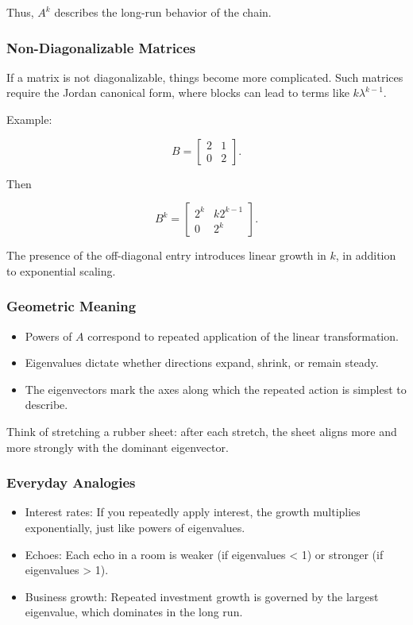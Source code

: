 \documentclass[
  letterpaper,
  DIV=11,
  numbers=noendperiod]{scrreprt}
\providecommand{\tightlist}{%
  \setlength{\itemsep}{0pt}\setlength{\parskip}{0pt}}
\begin{document}
Thus, \(A^k\) describes the long-run behavior of the chain.

\subsubsection{Non-Diagonalizable
Matrices}\label{non-diagonalizable-matrices}

If a matrix is not diagonalizable, things become more complicated. Such
matrices require the Jordan canonical form, where blocks can lead to
terms like \(k \lambda^{k-1}\).

Example:

\[
B = \begin{bmatrix} 2 & 1 \\ 0 & 2 \end{bmatrix}.
\]

Then

\[
B^k = \begin{bmatrix} 2^k & k 2^{k-1} \\ 0 & 2^k \end{bmatrix}.
\]

The presence of the off-diagonal entry introduces linear growth in
\(k\), in addition to exponential scaling.

\subsubsection{Geometric Meaning}\label{geometric-meaning-13}

\begin{itemize}
\tightlist
\item
  Powers of \(A\) correspond to repeated application of the linear
  transformation.
\item
  Eigenvalues dictate whether directions expand, shrink, or remain
  steady.
\item
  The eigenvectors mark the axes along which the repeated action is
  simplest to describe.
\end{itemize}

Think of stretching a rubber sheet: after each stretch, the sheet aligns
more and more strongly with the dominant eigenvector.

\subsubsection{Everyday Analogies}\label{everyday-analogies-61}

\begin{itemize}
\tightlist
\item
  Interest rates: If you repeatedly apply interest, the growth
  multiplies exponentially, just like powers of eigenvalues.
\item
  Echoes: Each echo in a room is weaker (if eigenvalues \textless{} 1)
  or stronger (if eigenvalues \textgreater{} 1).
\item
  Business growth: Repeated investment growth is governed by the largest
  eigenvalue, which dominates in the long run.
\end{itemize}
\end{document}
